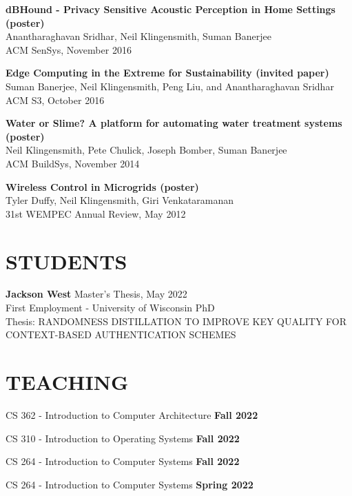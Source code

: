 \documentclass{res}
\begin{document}
\begin{resume}
\begin{etaremune}[leftmargin=0cm]
\item
    {\bf dBHound - Privacy Sensitive Acoustic Perception in Home Settings (poster)} \\
    Anantharaghavan Sridhar, Neil Klingensmith, Suman Banerjee \\
    ACM SenSys, November 2016

\item
    {\bf Edge Computing in the Extreme for Sustainability (invited paper)} \\
    Suman Banerjee, Neil Klingensmith, Peng Liu, and Anantharaghavan Sridhar \\
    ACM S3, October 2016

\item
    {\bf Water or Slime? A platform for automating water treatment systems (poster)} \\
    Neil Klingensmith, Pete Chulick, Joseph Bomber, Suman Banerjee \\
    ACM BuildSys, November 2014

\item
    {\bf Wireless Control in Microgrids (poster)} \\
    Tyler Duffy, Neil Klingensmith, Giri Venkataramanan \\
    31st WEMPEC Annual Review, May 2012


\end{etaremune}

\section{STUDENTS}

{\bf Jackson West} \hfill  Master's Thesis, May 2022 \\
First Employment - University of Wisconsin PhD \\
Thesis: RANDOMNESS DISTILLATION TO IMPROVE KEY QUALITY FOR CONTEXT-BASED AUTHENTICATION SCHEMES

\section{TEACHING}

CS 362 - Introduction to Computer Architecture
\hfill \textbf{Fall 2022}


CS 310 - Introduction to Operating Systems
\hfill \textbf{Fall 2022}

CS 264 - Introduction to Computer Systems
\hfill \textbf{Fall 2022}


CS 264 - Introduction to Computer Systems
\hfill \textbf{Spring 2022}


\end{resume}
\end{document}
